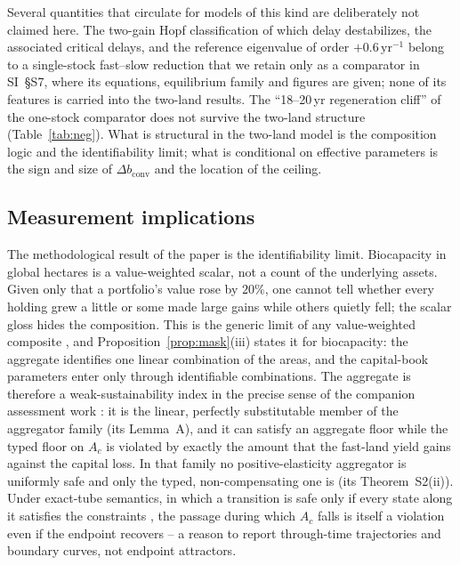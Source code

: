 \documentclass[preprint,12pt,authoryear]{elsarticle}
\newcommand{\dconv}{\Delta b_{\mathrm{conv}}}
\begin{document}
Several quantities that circulate for models of this kind are deliberately not claimed here. The two-gain Hopf classification of which delay destabilizes, the associated critical delays, and the reference eigenvalue of order $+0.6\,\mathrm{yr}^{-1}$ belong to a single-stock fast--slow reduction that we retain only as a comparator in SI~\S S7, where its equations, equilibrium family and figures are given; none of its features is carried into the two-land results. The ``18--20\,yr regeneration cliff'' of the one-stock comparator does not survive the two-land structure (Table~\ref{tab:neg}). What is structural in the two-land model is the composition logic and the identifiability limit; what is conditional on effective parameters is the sign and size of $\dconv$ and the location of the ceiling.

\subsection{Measurement implications}

The methodological result of the paper is the identifiability limit. Biocapacity in global hectares is a value-weighted scalar, not a count of the underlying assets. Given only that a portfolio's value rose by $20\%$, one cannot tell whether every holding grew a little or some made large gains while others quietly fell; the scalar gloss hides the composition. This is the generic limit of any value-weighted composite \citep{Nardo2008}, and Proposition~\ref{prop:mask}(iii) states it for biocapacity: the aggregate identifies one linear combination of the areas, and the capital-book parameters enter only through identifiable combinations. The aggregate is therefore a weak-sustainability index in the precise sense of the companion assessment work \citep{Abaee2026b}: it is the linear, perfectly substitutable member of the aggregator family (its Lemma~A), and it can satisfy an aggregate floor while the typed floor on $A_c$ is violated by exactly the amount that the fast-land yield gains against the capital loss. In that family no positive-elasticity aggregator is uniformly safe and only the typed, non-compensating one is (its Theorem~S2(ii)). Under exact-tube semantics, in which a transition is safe only if every state along it satisfies the constraints \citep{Abaee2026b}, the passage during which $A_c$ falls is itself a violation even if the endpoint recovers -- a reason to report through-time trajectories and boundary curves, not endpoint attractors.
\end{document}
